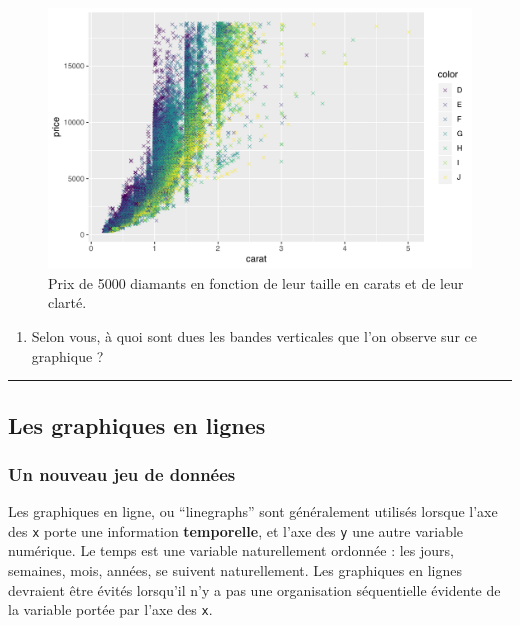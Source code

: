 \documentclass[
  a4paper,
]{article}
\providecommand{\tightlist}{%
  \setlength{\itemsep}{0pt}\setlength{\parskip}{0pt}}
\begin{document}
\begin{figure}[htpb]

{\centering \includegraphics[width=0.9\linewidth]{figure/exodiamonds-1} 

}

\caption{Prix de 5000 diamants en fonction de leur taille en carats et de leur clarté.}\label{fig:exodiamonds}
\end{figure}

\begin{enumerate}
\def\labelenumi{\arabic{enumi}.}
\setcounter{enumi}{3}
\tightlist
\item
  Selon vous, à quoi sont dues les bandes verticales que l'on observe sur ce graphique ?
\end{enumerate}

\begin{center}\rule{0.5\linewidth}{0.5pt}\end{center}

\hypertarget{les-graphiques-en-lignes}{%
\subsection{Les graphiques en lignes}\label{les-graphiques-en-lignes}}

\hypertarget{un-nouveau-jeu-de-donnuxe9es}{%
\subsubsection{Un nouveau jeu de données}\label{un-nouveau-jeu-de-donnuxe9es}}

Les graphiques en ligne, ou ``linegraphs'' sont généralement utilisés lorsque l'axe des \texttt{x} porte une information \textbf{temporelle}, et l'axe des \texttt{y} une autre variable numérique. Le temps est une variable naturellement ordonnée : les jours, semaines, mois, années, se suivent naturellement. Les graphiques en lignes devraient être évités lorsqu'il n'y a pas une organisation séquentielle évidente de la variable portée par l'axe des \texttt{x}.
\end{document}
